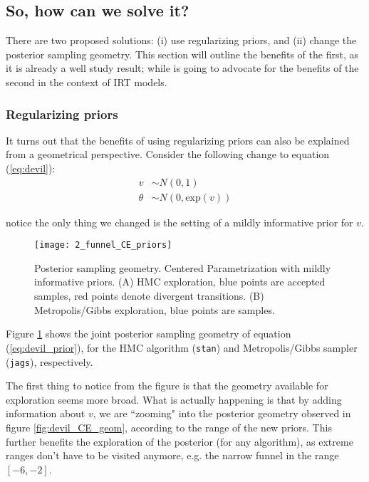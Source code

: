
\subsection{So, how can we solve it?}

There are two proposed solutions: (i) use regularizing priors, and (ii) change the posterior sampling geometry. This section will outline the benefits of the first, as it is already a well study result; while is going to advocate for the benefits of the second in the context of IRT models.

\subsubsection{Regularizing priors}

It turns out that the benefits of using regularizing priors can also be explained from a geometrical perspective. Consider the following change to equation (\ref{eq:devil}):
%
\begin{equation} \label{eq:devil_prior}
	\begin{split}	
		v &\sim N(0, 1) \\
		\theta &\sim N(0, \text{exp}(v))
	\end{split}
\end{equation}

\noindent notice the only thing we changed is the setting of a mildly informative prior for $v$. 
%
\begin{figure}[h]
	\centering
	\texttt{[image: 2\_funnel\_CE\_priors]}
	\caption[Posterior sampling geometry. Centered Parametrization with mildly informative priors.]%
	{Posterior sampling geometry. Centered Parametrization with mildly informative priors. (A) HMC exploration, blue points are accepted samples, red points denote divergent transitions. (B) Metropolis/Gibbs exploration, blue points are samples.}
	\label{fig:devil_prior_geom}
\end{figure}

Figure \ref{fig:devil_prior_geom} shows the joint posterior sampling geometry of equation (\ref{eq:devil_prior}), for the HMC algorithm (\texttt{stan}) and Metropolis/Gibbs sampler (\texttt{jags}), respectively. 

The first thing to notice from the figure is that the geometry available for exploration seems more broad. What is actually happening is that by adding information about $v$, we are ``zooming" into the posterior geometry observed in figure \ref{fig:devil_CE_geom}, according to the range of the new priors. This further benefits the exploration of the posterior (for any algorithm), as extreme ranges don't have to be visited anymore, e.g. the narrow funnel in the range $[-6,-2]$.

